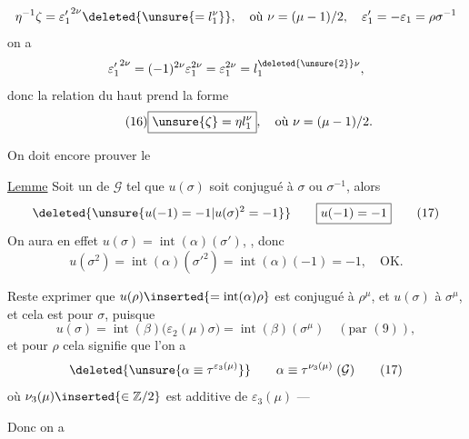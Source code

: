 
\[
\eta^{-1}\zeta={\varepsilon'_1}^{2\nu}\deleted{\unsure{=l_1^\nu}},
\quad\text{où }\nu=(\mu-1)/2,\quad\varepsilon'_1=-\varepsilon_1=\rho\sigma^{-1}
\]
on a
\[
{\varepsilon'_1}^{2\nu}=(-1)^{2\nu}\varepsilon_1^{2\nu}
=\varepsilon_1^{2\nu}=l_1^{\deleted{\unsure{2}}\nu},
\]
donc la relation du haut prend la forme
\[
\tag{16}
\boxed{\unsure{\zeta}=\eta l_1^\nu},\quad\text{où }\nu=(\mu-1)/2.
\]

On doit encore prouver le

\uline{Lemme} Soit  un  de $\mathcal{G}$ tel que $u(\sigma)$ soit conjugué  à $\sigma$ ou $\sigma^{-1}$, alors
\[
\deleted{\unsure{u(-1)=-1|u(\sigma)^2=-1}}
\qquad\boxed{u(-1)=-1}
\tag{17}
\]
On aura en effet $u(\sigma)=\operatorname{int}(\alpha)(\sigma')$, , donc
\[
u(\sigma^2)=\operatorname{int}(\alpha)({\sigma'}^2)
=\operatorname{int}(\alpha)(-1)=-1,\quad\text{OK.}
\]

Reste  exprimer  que  $u(\rho)\inserted{=\operatorname{int}(\alpha)\rho}$ est conjugué à $\rho^\mu$, et $u(\sigma)$ à $\sigma^\mu$, et cela est   pour $\sigma$, puisque
\[
u(\sigma)=\operatorname{int}(\beta)\bigl(\varepsilon_2(\mu)\sigma\bigr)
=\operatorname{int}(\beta)(\sigma^\mu)\quad(\text{par }(9)),
\]
et pour $\rho$ cela signifie que l'on a
\[
\deleted{\unsure{\alpha\equiv\tau^{\varepsilon_3(\mu)}}}
\qquad\alpha\equiv\tau^{\nu_3(\mu)}\;(\mathcal{G})
\tag{17}
\]
où $\nu_3(\mu)\inserted{\in\mathbb{Z}/2}$ est   additive de $\varepsilon_3(\mu)$ —

Donc on a 

